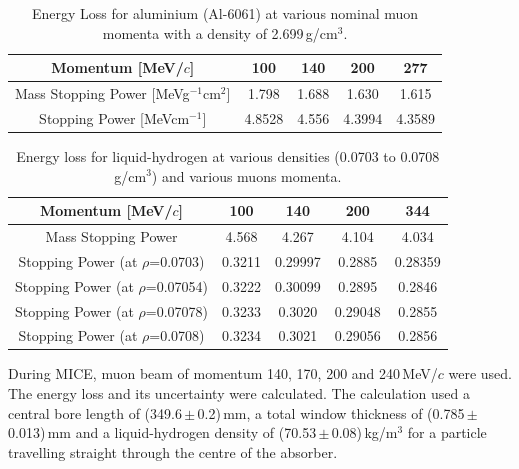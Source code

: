 \begin{table}[htb!]
  \caption{
    Energy Loss for aluminium (Al-6061) at various nominal muon momenta with a density of 2.699\,g/cm$^{3}$.
  }
  \label{tab:Aluminium}
  \begin{center}
    \begin{tabular}{c|c|c|c|c}
    
Momentum [MeV/$c$] & 100 & 140 & 200 & 277     \rule{0pt}{14pt} \\
\hline
{Mass Stopping Power [MeVg${}^{-1}$cm${}^{2}$] } & 1.798 & 1.688 & 1.630 & 1.615
\\
{Stopping Power [MeVcm${}^{-1}$] } & 4.8528 & 4.556 & 4.3994 & 4.3589
\\

    \end{tabular}
  \end{center}
\end{table} 

\begin{table}
  \caption{
    Energy loss for liquid-hydrogen at various densities (0.0703 to 0.0708 g/cm${}^{3}$) and various muons momenta.}
  \label{tab:Hydrogen}
  \begin{center}
    \begin{tabular}{c|c|c|c|c}
Momentum [MeV/$c$] & 100 & 140 & 200 & 344     \rule{0pt}{14pt} \\
\hline
{Mass Stopping Power} & 4.568 & 4.267 & 4.104 & 4.034 \\
{Stopping Power }(at $\rho$=0.0703)\textbf{} & 0.3211 & 0.29997 & 0.2885 & 0.28359\\
{Stopping Power }(at $\rho$=0.07054)\textbf{} & 0.3222 & 0.30099 & 0.2895 & 0.2846 \\
{Stopping Power }(at $\rho$=0.07078)\textbf{} & 0.3233 & 0.3020 & 0.29048 & 0.2855 \\
{Stopping Power }(at $\rho$=0.0708)\textbf{} & 0.3234 & 0.3021 & 0.29056 & 0.2856 \\
    \end{tabular}
  \end{center}
\end{table} 


During MICE, muon beam of momentum 140, 170, 200 and 240\,MeV/$c$ were used. The energy loss and its uncertainty were calculated. The calculation used a central bore length of (349.6\,$\mathrm{\pm}$\,0.2)\,mm, a total window thickness of (0.785\,$\mathrm{\pm}$\,0.013)\,mm and a liquid-hydrogen density of (70.53\,$\mathrm{\pm}$\,0.08)\,kg/m$^{3}$ for a particle travelling straight through the centre of the absorber.

